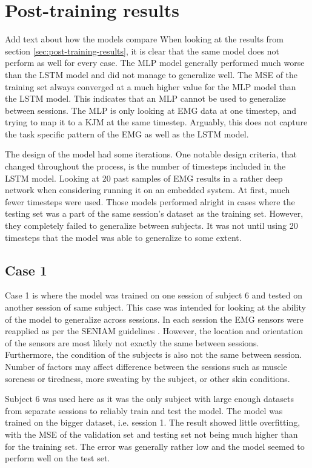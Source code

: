 \documentclass[../main.tex]{subfiles}
\begin{document}
\section{Post-training results}
\label{sec:discussion_post-training-results}
Add text about how the models compare
When looking at the results from section \ref{sec:post-training-results}, it is clear that the same model does not perform as well for every case.
The \ac{MLP} model generally performed much worse than the \ac{LSTM} model and did not manage to generalize well.
The \ac{MSE} of the training set always converged at a much higher value for the \ac{MLP} model than the \ac{LSTM} model.
This indicates that an \ac{MLP} cannot be used to generalize between sessions.
The \ac{MLP} is only looking at \ac{EMG} data at one timestep, and trying to map it to a \ac{KJM} at the same timestep.
Arguably, this does not capture the task specific pattern of the \ac{EMG} as well as the \ac{LSTM} model.

The design of the model had some iterations. 
One notable design criteria, that changed throughout the process, is the number of timesteps included in the \ac{LSTM} model.
Looking at 20 past samples of \ac{EMG} results in a rather deep network when considering running it on an embedded system.
At first, much fewer timesteps were used.
Those models performed alright in cases where the testing set was a part of the same session's dataset as the training set.
However, they completely failed to generalize between subjects.
It was not until using 20 timesteps that the model was able to generalize to some extent.

\subsection{Case 1}
\label{sec:discussion-case1}
Case 1 is where the model was trained on one session of subject 6 and tested on another session of same subject.
This case was intended for looking at the ability of the model to generalize across sessions.
In each session the \ac{EMG} sensors were reapplied as per the \ac{SENIAM} guidelines \cite{Hermens1999, Hermens2000}.
However, the location and orientation of the sensors are most likely not exactly the same between sessions.
Furthermore, the condition of the subjects is also not the same between session.
Number of factors may affect difference between the sessions such as muscle soreness or tiredness, more sweating by the subject, or other skin conditions.

Subject 6 was used here as it was the only subject with large enough datasets from separate sessions to reliably train and test the model.
The model was trained on the bigger dataset, i.e. session 1.
The result showed little overfitting, with the \ac{MSE} of the validation set and testing set not being much higher than for the training set.
The error was generally rather low and the model seemed to perform well on the test set.
\end{document}
